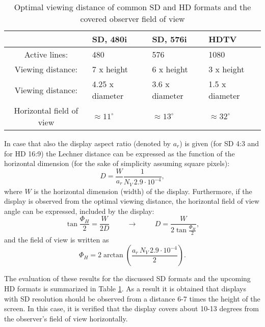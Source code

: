 \begin{table}[h!]
\caption{Optimal viewing distance of common SD and HD formats and the covered observer field of view}
\renewcommand*{\arraystretch}{2.25}
\label{tab:viewing_dist}
\begin{center}
    \begin{tabular}[h!]{ @{}c | | l | l | l @{} }%
				         &   SD, 480i & SD, 576i &	 HDTV \\ \hline
    Active lines:	 &     480 	  		   &   576   				&	 1080\\
    Viewing distance:   &  7 x height &  6 x height & 3 x height\\
    Viewing distance:       &  4.25 x diameter &  3.6 x diameter & 1.5 x diameter\\
    Horizontal field of view &  $\approx 11^{\circ}$ &    $\approx 13^{\circ}$ & $\approx 32^{\circ}$ \\
    \end{tabular}
\end{center}
\end{table}

In case that also the display aspect ratio (denoted by $a_r$) is given (for SD 4:3 and for HD 16:9) the Lechner distance can be expressed as the function of the horizontal dimension (for the sake of simplicity assuming square pixels):
\begin{equation}
D = \frac{W}{a_r} \frac{1}{N_V \,2.9 \cdot 10^{-4}},
\end{equation}
where $W$ is the horizontal dimension (width) of the display.
Furthermore, if the display is observed from the optimal viewing distance, the horizontal field of view angle can be expressed, included by the display:
\begin{equation}
\tan \frac{\Phi_H}{2} = \frac{W}{2 D} \hspace{1cm} \rightarrow \hspace{1cm} D = \frac{W}{2 \tan \frac{\Phi_H}{2}}, 
\end{equation}
and the field of view is written as
\begin{equation}
\Phi_H = 2\arctan \left( \frac{a_r \, N_V \, 2.9\cdot 10^{-4}}{2} \right).
\end{equation}

The evaluation of these results for the discussed SD formats and the upcoming HD formats is summarized in Table \ref{tab:viewing_dist}.
As a result it is obtained that displays with SD resolution should be observed from a distance 6-7 times the height of the screen.
In this case, it is verified that the display covers about 10-13 degrees from the observer's field of view horizontally.


